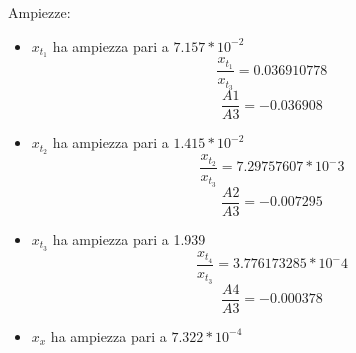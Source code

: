 \documentclass{article}
\begin{document}
Ampiezze:
\begin{itemize}

    \item $x_{t_1}$ ha ampiezza pari a $7.157*10^{-2}$
    \begin{equation*}
    \frac{x_{t_1}}{x_{t_3}} = 0.036910778
    \end{equation*}
    \begin{equation*}\frac{A1}{A3} = -0.036908 \end{equation*}
    
    \item $x_{t_2}$ ha ampiezza pari a $1.415*10^{-2}$
        \begin{equation*}
    \frac{x_{t_2}}{x_{t_3}} = 7.29757607*10^-3
    \end{equation*}
      \begin{equation*} \frac{A2}{A3} = -0.007295  \end{equation*}
    
    \item $x_{t_3}$ ha ampiezza pari a 1.939	
        \begin{equation*}
    \frac{x_{t_4}}{x_{t_3}} = 3.776173285*10^-4
    \end{equation*}
    \begin{equation*}  \frac{A4}{A3} = -0.000378 	 \end{equation*}
    
    \item $	x_{x}$ ha ampiezza pari a $7.322*10^{-4}$
    \end{itemize}
    
\end{document}
